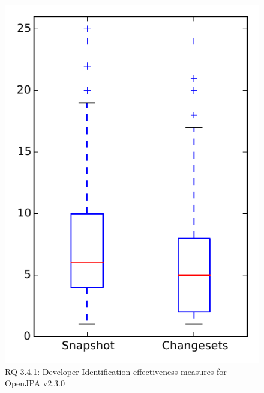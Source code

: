 
\begin{figure}
\centering
\includegraphics[height=0.4\textheight]{figures/dit/rq1_openjpa}
\caption{RQ 3.4.1: Developer Identification effectiveness measures for OpenJPA v2.3.0}
\label{fig:dit:rq1:openjpa}
\end{figure}
